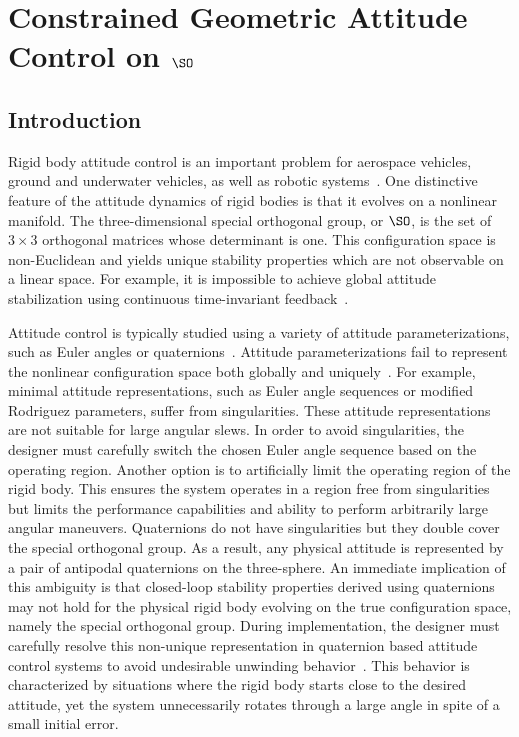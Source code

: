 
\chapter{Constrained Geometric Attitude Control on \( \SO \) }


\section{Introduction}\label{sec:intro}

Rigid body attitude control is an important problem for aerospace vehicles, ground and underwater vehicles, as well as robotic systems~\cite{hughes2004,wertz1978}.
One distinctive feature of the attitude dynamics of rigid bodies is that it evolves on a nonlinear manifold.
The three-dimensional special orthogonal group, or \( \SO \), is the set of \( 3 \times 3 \) orthogonal matrices whose determinant is one.
This configuration space is non-Euclidean and yields unique stability properties which are not observable on a linear space.
For example, it is impossible to achieve global attitude stabilization using continuous time-invariant feedback~\cite{bhat2000}.



Attitude control is typically studied using a variety of attitude parameterizations, such as Euler angles or quaternions~\cite{shuster1993}.
Attitude parameterizations fail to represent the nonlinear configuration space both globally and uniquely~\cite{chaturvedi2011a}.
For example, minimal attitude representations, such as Euler angle sequences or modified Rodriguez parameters, suffer from singularities.
These attitude representations are not suitable for large angular slews.
In order to avoid singularities, the designer must carefully switch the chosen Euler angle sequence based on the operating region.
Another option is to artificially limit the operating region of the rigid body.
This ensures the system operates in a region free from singularities but limits the performance capabilities and ability to perform arbitrarily large angular maneuvers.
Quaternions do not have singularities but they double cover the special orthogonal group.
As a result, any physical attitude is represented by a pair of antipodal quaternions on the three-sphere.
An immediate implication of this ambiguity is that closed-loop stability properties derived using quaternions may not hold for the physical rigid body evolving on the true configuration space, namely the special orthogonal group.
During implementation, the designer must carefully resolve this non-unique representation in quaternion based attitude control systems to avoid undesirable unwinding behavior~\cite{bhat2000}.
This behavior is characterized by situations where the rigid body starts close to the desired attitude, yet the system unnecessarily rotates through a large angle in spite of a small initial error. 


